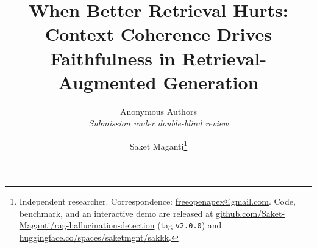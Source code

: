 \documentclass[12pt]{article}
\title{\LARGE\bfseries When Better Retrieval Hurts:\\[0.3em]
Context Coherence Drives Faithfulness in Retrieval-Augmented Generation}
\author{Anonymous Authors\\\textit{Submission under double-blind review}}
\author{%
    Saket Maganti\thanks{%
      Independent researcher.  Correspondence:
      \href{mailto:freeopenapex@gmail.com}{freeopenapex@gmail.com}.
      Code, benchmark, and an interactive demo are released at
      \href{https://github.com/Saket-Maganti/rag-hallucination-detection}{github.com/Saket-Maganti/rag-hallucination-detection}
      (tag \texttt{v2.0.0}) and
      \href{https://huggingface.co/spaces/saketmgnt/sakkk}{huggingface.co/spaces/saketmgnt/sakkk}.
    }
  }
\date{}
\theoremstyle{plain}
\theoremstyle{definition}
\begin{document}
\maketitle

\begin{abstract}

\end{abstract}














\appendix

\end{document}

